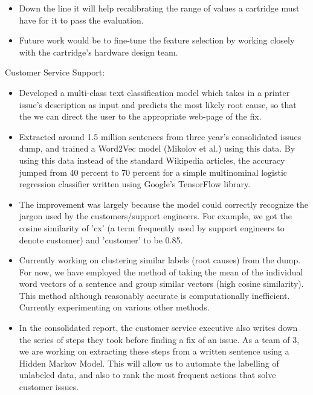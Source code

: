 \begin{cventries}
{\begin{cvitems}
{{\begin{itemize}[leftmargin=3ex, nosep, noitemsep]
                \item {Down the line it will help recalibrating the range of values a cartridge must have for it to pass the evaluation.}
                \item {Future work would be to fine-tune the feature selection by working closely with the cartridge's hardware design team.}
            \end{itemize} 
            }
        }
        \item 
        {
            \project
            {Customer Service Support:}
            {\begin{itemize}[leftmargin=3ex, nosep, noitemsep]
            \setlength{\parskip}{2pt}
            \renewcommand{\labelitemii}{\textbullet}
                \item {Developed a multi-class text classification model which takes in a printer issue's description as input and predicts the most likely root cause, so that the we can direct the user to the appropriate web-page of the fix. %
                }
                \item {Extracted around 1.5 million sentences from three year's consolidated issues dump, and trained a Word2Vec model (Mikolov et al.) using this data. By using this data instead of the standard Wikipedia articles, the accuracy jumped from 40 percent to 70 percent for a simple multinominal logistic regression classifier written using Google's TensorFlow library.}
                \item {The improvement was largely because the model could correctly recognize the jargon used by the customers/support engineers. For example, we got the cosine similarity of 'cx' (a term frequently used by support engineers to denote customer) and 'customer' to be 0.85.}
                \item {Currently working on clustering similar labels (root causes) from the dump. For now, we have employed the method of taking the mean of the individual word vectors of a sentence and group similar vectors (high cosine similarity). This method although reasonably accurate is computationally inefficient. Currently experimenting on various other methods.}
                \item {In the consolidated report, the customer service executive also writes down the series of steps they took before finding a fix of an issue. As a team of 3, we are working on extracting these steps from a written sentence using a Hidden Markov Model. This will allow us to automate the labelling of unlabeled data, and also to rank the most frequent actions that solve customer issues.}
            \end{itemize} 
            }
        }
      \end{cvitems}
    }
\end{cventries}
